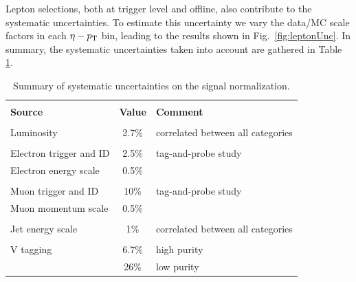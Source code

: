 Lepton selections, both at trigger level and offline, also contribute to the systematic uncertainties. To estimate this uncertainty we vary the data/MC scale factors in each $\eta-p_{\rm T}$ bin, leading to the results shown in Fig.~\ref{fig:leptonUnc}. In summary, the systematic uncertainties taken into account are gathered in Table \ref{tab:systematics}.

\begin{table}[h!]
\begin{center}
\caption[Systematic Uncertainties]{Summary of systematic uncertainties on the signal normalization.}
\label{tab:systematics}
\begin{tabular}{lcl}
\hline\\[-0.2cm]
\textbf{Source}     & \textbf{Value} & \textbf{Comment} \\[0.2cm]
\hline\hline\\[-0.2cm]
Luminosity      & 2.7\%           & correlated between all categories \\[0.2cm]\hline\\[-0.2cm]
Electron trigger and ID & 2.5\% & tag-and-probe study \\[0.2cm] 
Electron energy scale   & 0.5\% & \\[0.2cm]\hline\\[-0.2cm]
Muon trigger and ID & 10\% & tag-and-probe study \\[0.2cm]
Muon momentum scale & 0.5\% & \\[0.2cm]\hline\\[-0.2cm]
Jet energy scale    & 1\% & correlated between all categories \\[0.2cm]\hline\\[-0.2cm]
V tagging           & 6.7\% & high purity \\[0.2cm]
                    & 26\%  & low purity  \\[0.2cm]
\hline
\end{tabular}
\end{center}
\end{table}

